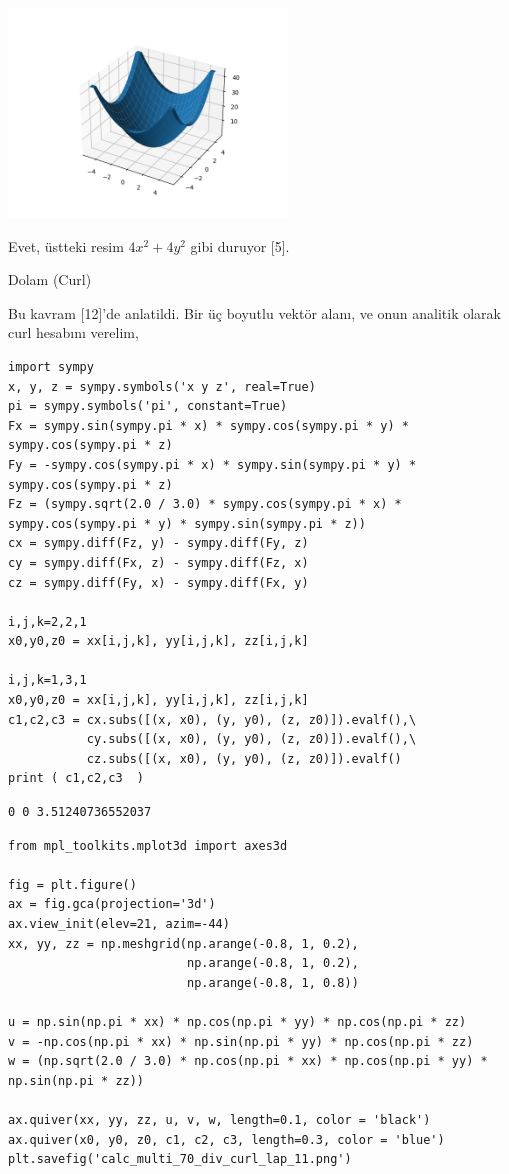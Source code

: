 \documentclass[12pt,fleqn]{article}\usepackage{../../common}
\begin{document}
\includegraphics[width=20em]{calc_multi_70_div_curl_lap_02.png}

Evet, üstteki resim $4 x^2 + 4 y^2$ gibi duruyor [5].

Dolam (Curl)

Bu kavram [12]'de anlatildi.  Bir üç boyutlu vektör alanı, ve onun analitik
olarak curl hesabını verelim,

\begin{verbatim}
import sympy
x, y, z = sympy.symbols('x y z', real=True)
pi = sympy.symbols('pi', constant=True)
Fx = sympy.sin(sympy.pi * x) * sympy.cos(sympy.pi * y) * sympy.cos(sympy.pi * z)
Fy = -sympy.cos(sympy.pi * x) * sympy.sin(sympy.pi * y) * sympy.cos(sympy.pi * z)
Fz = (sympy.sqrt(2.0 / 3.0) * sympy.cos(sympy.pi * x) * sympy.cos(sympy.pi * y) * sympy.sin(sympy.pi * z))
cx = sympy.diff(Fz, y) - sympy.diff(Fy, z) 
cy = sympy.diff(Fx, z) - sympy.diff(Fz, x)
cz = sympy.diff(Fy, x) - sympy.diff(Fx, y)

i,j,k=2,2,1
x0,y0,z0 = xx[i,j,k], yy[i,j,k], zz[i,j,k]

i,j,k=1,3,1
x0,y0,z0 = xx[i,j,k], yy[i,j,k], zz[i,j,k]
c1,c2,c3 = cx.subs([(x, x0), (y, y0), (z, z0)]).evalf(),\
           cy.subs([(x, x0), (y, y0), (z, z0)]).evalf(),\
           cz.subs([(x, x0), (y, y0), (z, z0)]).evalf()
print ( c1,c2,c3  )

\end{verbatim}

\begin{verbatim}
0 0 3.51240736552037
\end{verbatim}

\begin{verbatim}
from mpl_toolkits.mplot3d import axes3d

fig = plt.figure()
ax = fig.gca(projection='3d')
ax.view_init(elev=21, azim=-44)
xx, yy, zz = np.meshgrid(np.arange(-0.8, 1, 0.2),
                         np.arange(-0.8, 1, 0.2),
                         np.arange(-0.8, 1, 0.8))

u = np.sin(np.pi * xx) * np.cos(np.pi * yy) * np.cos(np.pi * zz)
v = -np.cos(np.pi * xx) * np.sin(np.pi * yy) * np.cos(np.pi * zz)
w = (np.sqrt(2.0 / 3.0) * np.cos(np.pi * xx) * np.cos(np.pi * yy) *  np.sin(np.pi * zz))

ax.quiver(xx, yy, zz, u, v, w, length=0.1, color = 'black')
ax.quiver(x0, y0, z0, c1, c2, c3, length=0.3, color = 'blue')
plt.savefig('calc_multi_70_div_curl_lap_11.png')
\end{verbatim}
\end{document}
